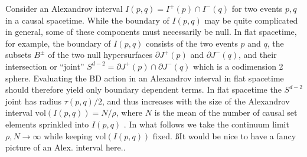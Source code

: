 \documentclass[12pt]{article}
\begin{document}
Consider an Alexandrov interval $I (p,q)=I^+ (p) \cap I^- (q)$ for two events $p,q$ in a causal spacetime.   While the  boundary of $I (p,q)$ may be quite complicated in general, some of these components must necessarily be null.  In flat spacetime, for example,  the boundary of $I (p,q)$ consists of the two events $p$ and $q$, the subsets $B^\pm$ of the  two null hypersurfaces $\partial J^+ (p)$ and $\partial J^- (q)$, and their intersection or ``joint''  $S^{d-2}=\partial J^+ (p) \cap \partial J^- (q)$ which is a codimension 2 sphere.  Evaluating the BD action in an Alexandrov interval in flat spacetime should therefore yield  only boundary dependent terms.  In flat spacetime the $S^{d-2}$ joint  has radius $\tau (p,q)/2$, and thus increases with the size of the Alexandrov interval ${\mathrm{vol}} (I (p,q)) = N/\rho$, where $N$ is the mean of the number of causal set elements sprinkled into $I (p,q)$ . In what follows we take the continuum limit $\rho, N \rightarrow \infty$ while keeping ${\mathrm{vol}} (I (p,q))$ fixed. \ss{It would be nice to have a fancy picture of an Alex. interval here..}  
\end{document}
